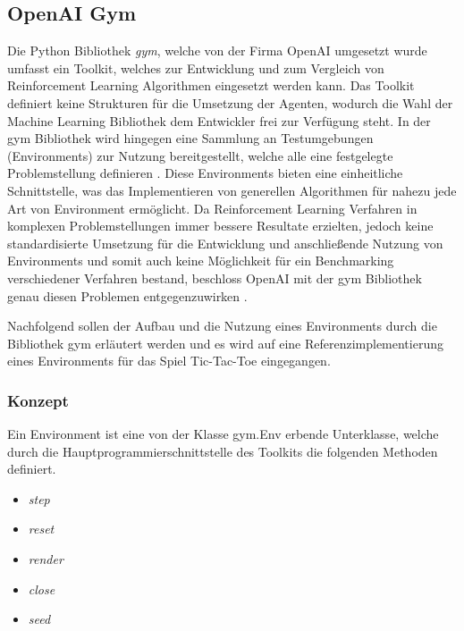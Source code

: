 \documentclass[11pt]{scrartcl}
\begin{document}
\subsection{OpenAI Gym}
Die Python Bibliothek \textit{gym}, welche von der Firma OpenAI umgesetzt wurde umfasst ein
Toolkit, welches zur Entwicklung und zum Vergleich von Reinforcement Learning Algorithmen
eingesetzt werden kann. Das Toolkit definiert keine Strukturen für die Umsetzung der Agenten,
wodurch die Wahl der Machine Learning Bibliothek dem Entwickler frei zur Verfügung steht. In
der gym Bibliothek wird hingegen eine Sammlung an Testumgebungen (Environments) zur Nutzung
bereitgestellt, welche alle eine festgelegte Problemstellung definieren \cite{OAI2016}. 
Diese Environments bieten eine einheitliche Schnittstelle, was das Implementieren von
generellen Algorithmen für nahezu jede Art von Environment ermöglicht. Da Reinforcement
Learning Verfahren in komplexen Problemstellungen immer bessere Resultate erzielten, jedoch
keine standardisierte Umsetzung für die Entwicklung und anschließende Nutzung von Environments
und somit auch keine Möglichkeit für ein Benchmarking verschiedener Verfahren bestand,
beschloss OpenAI mit der gym Bibliothek genau diesen Problemen entgegenzuwirken
\cite{OAI2016}.

Nachfolgend sollen der Aufbau und die Nutzung eines Environments durch die Bibliothek gym
erläutert werden und es wird auf eine Referenzimplementierung eines Environments für das
Spiel Tic-Tac-Toe eingegangen.


\subsubsection{Konzept}
Ein Environment ist eine von der Klasse gym.Env erbende Unterklasse, welche durch die
Hauptprogrammierschnittstelle des Toolkits die folgenden Methoden definiert.

\begin{itemize}
\itemsep-6pt
\item \textit{step}
\item \textit{reset}
\item \textit{render}
\item \textit{close}
\item \textit{seed}
\end{itemize}  
\end{document}
